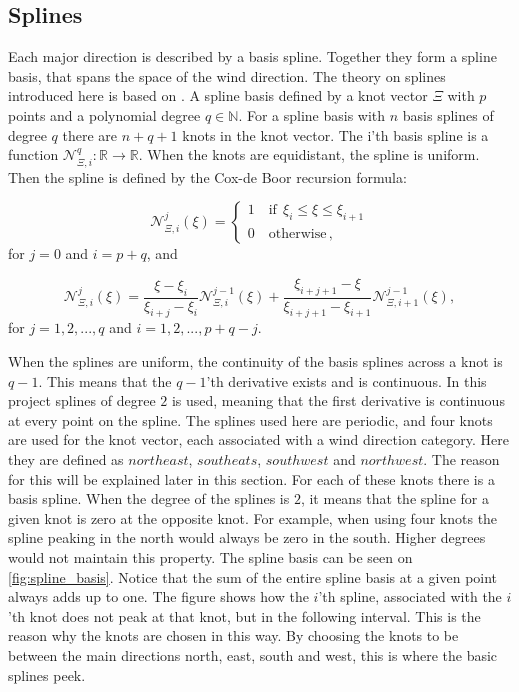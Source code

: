 \subsection{Splines}
Each major direction is described by a basis spline. Together they form a spline basis, that spans the space of the wind direction. The theory on splines introduced here is based on \cite{Splines}. A spline basis defined by a knot vector $\Xi$ with $p$ points and a polynomial degree $q\in \mathbb{N}$. For a spline basis with $n$ basis splines of degree $q$ there are $n+q+1$ knots in the knot vector. The i'th basis spline is a function $\mathcal{N}^q_{\Xi,i}: \mathbb{R} \rightarrow \mathbb{R}$. When the knots are equidistant, the spline is uniform. Then the spline is defined by the Cox-de Boor recursion formula:

\begin{equation}
    \mathcal{N}_{\Xi,i}^j (\xi) =
    \begin{cases}
    1 \quad \text{if} \ \ \xi_i \leq \xi \leq \xi_{i+1}\\
    0 \quad \text{otherwise}\,,
    \end{cases}
    \end{equation}
    for $j = 0$ and $i = p + q$, and

    \begin{equation}
        \mathcal{N}_{\Xi,i}^j(\xi) = \frac{\xi-\xi_i}{\xi_{i+j}-\xi_i}\mathcal{N}_{\Xi,i}^{j-1}(\xi) + \frac{\xi_{i+j+1}-\xi}{\xi_{i+j+1}-\xi_{i+1}} \mathcal{N}_{\Xi, i + 1}^{j-1}(\xi),
    \end{equation}
    for $j = 1,2,..., q$ and $i = 1,2,..., p + q - j$.

\noindent When the splines are uniform, the continuity of the basis splines across a knot is $q-1$. This means that the $q-1$'th derivative exists and is continuous. In this project splines of degree $2$ is used, meaning that the first derivative is continuous at every point on the spline. The splines used here are periodic, and four knots are used for the knot vector, each associated with a wind direction category. Here they are defined as $northeast$, $southeats$, $southwest$ and $northwest$. The reason for this will be explained later in this section. For each of these knots there is a basis spline. When the degree of the splines is $2$, it means that the spline for a given knot is zero at the opposite knot. For example, when using four knots the spline peaking in the north would always be zero in the south. Higher degrees would not maintain this property. The spline basis can be seen on \cref{fig:spline_basis}. Notice that the sum of the entire spline basis at a given point always adds up to one. The figure shows how the $i$'th spline, associated with the $i$'th knot does not peak at that knot, but in the following interval. This is the reason why the knots are chosen in this way. By choosing the knots to be between the main directions north, east, south and west, this is where the basic splines peek.




